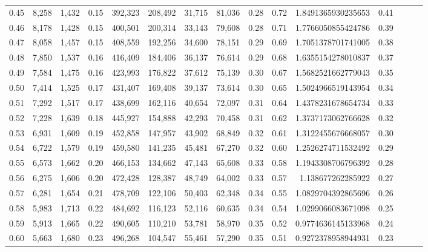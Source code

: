 \begin{tabular}{rrrrrrrrrrrrrrr}
0.45 &   8,258 &  1,432 &  0.15 &  392,323 &  208,492 &   31,715 &   81,036 &  0.28 &  0.72 &     1.8491365930235653 &      0.41 \\
0.46 &   8,178 &  1,428 &  0.15 &  400,501 &  200,314 &   33,143 &   79,608 &  0.28 &  0.71 &     1.7766050855424786 &      0.39 \\
0.47 &   8,058 &  1,457 &  0.15 &  408,559 &  192,256 &   34,600 &   78,151 &  0.29 &  0.69 &     1.7051378701741005 &      0.38 \\
0.48 &   7,850 &  1,537 &  0.16 &  416,409 &  184,406 &   36,137 &   76,614 &  0.29 &  0.68 &     1.6355154278010837 &      0.37 \\
0.49 &   7,584 &  1,475 &  0.16 &  423,993 &  176,822 &   37,612 &   75,139 &  0.30 &  0.67 &     1.5682521662779043 &      0.35 \\
0.50 &   7,414 &  1,525 &  0.17 &  431,407 &  169,408 &   39,137 &   73,614 &  0.30 &  0.65 &     1.5024966519143954 &      0.34 \\
0.51 &   7,292 &  1,517 &  0.17 &  438,699 &  162,116 &   40,654 &   72,097 &  0.31 &  0.64 &     1.4378231678654734 &      0.33 \\
0.52 &   7,228 &  1,639 &  0.18 &  445,927 &  154,888 &   42,293 &   70,458 &  0.31 &  0.62 &     1.3737173062766628 &      0.32 \\
0.53 &   6,931 &  1,609 &  0.19 &  452,858 &  147,957 &   43,902 &   68,849 &  0.32 &  0.61 &     1.3122455676668057 &      0.30 \\
0.54 &   6,722 &  1,579 &  0.19 &  459,580 &  141,235 &   45,481 &   67,270 &  0.32 &  0.60 &     1.2526274711532492 &      0.29 \\
0.55 &   6,573 &  1,662 &  0.20 &  466,153 &  134,662 &   47,143 &   65,608 &  0.33 &  0.58 &     1.1943308706796392 &      0.28 \\
0.56 &   6,275 &  1,606 &  0.20 &  472,428 &  128,387 &   48,749 &   64,002 &  0.33 &  0.57 &      1.138677262285922 &      0.27 \\
0.57 &   6,281 &  1,654 &  0.21 &  478,709 &  122,106 &   50,403 &   62,348 &  0.34 &  0.55 &     1.0829704392865696 &      0.26 \\
0.58 &   5,983 &  1,713 &  0.22 &  484,692 &  116,123 &   52,116 &   60,635 &  0.34 &  0.54 &     1.0299066083671098 &      0.25 \\
0.59 &   5,913 &  1,665 &  0.22 &  490,605 &  110,210 &   53,781 &   58,970 &  0.35 &  0.52 &     0.9774636145133968 &      0.24 \\
0.60 &   5,663 &  1,680 &  0.23 &  496,268 &  104,547 &   55,461 &   57,290 &  0.35 &  0.51 &     0.9272378958944931 &      0.23 \\

\end{tabular}
